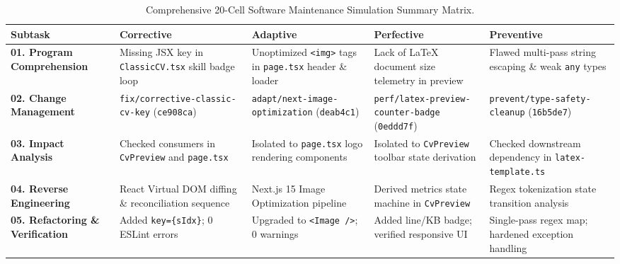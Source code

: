 \documentclass[12pt,a4paper]{article}
\begin{document}
\begin{table}[H]
\centering
\small
\begin{tabularx}{\textwidth}{l p{2.8cm} p{2.8cm} p{2.8cm} p{2.8cm}}
\toprule
\textbf{Subtask} & \textbf{Corrective} & \textbf{Adaptive} & \textbf{Perfective} & \textbf{Preventive} \\
\midrule
\textbf{01. Program Comprehension} & Missing JSX key in \texttt{ClassicCV.tsx} skill badge loop & Unoptimized \texttt{<img>} tags in \texttt{page.tsx} header \& loader & Lack of LaTeX document size telemetry in preview & Flawed multi-pass string escaping \& weak \texttt{any} types \\
\addlinespace
\textbf{02. Change Management} & \texttt{fix/corrective-classic-cv-key} (\texttt{ce908ca}) & \texttt{adapt/next-image-optimization} (\texttt{deab4c1}) & \texttt{perf/latex-preview-counter-badge} (\texttt{0eddd7f}) & \texttt{prevent/type-safety-cleanup} (\texttt{16b5de7}) \\
\addlinespace
\textbf{03. Impact Analysis} & Checked consumers in \texttt{CvPreview} and \texttt{page.tsx} & Isolated to \texttt{page.tsx} logo rendering components & Isolated to \texttt{CvPreview} toolbar state derivation & Checked downstream dependency in \texttt{latex-template.ts} \\
\addlinespace
\textbf{04. Reverse Engineering} & React Virtual DOM diffing \& reconciliation sequence & Next.js 15 Image Optimization pipeline & Derived metrics state machine in \texttt{CvPreview} & Regex tokenization state transition analysis \\
\addlinespace
\textbf{05. Refactoring \& Verification} & Added \texttt{key=\{sIdx\}}; 0 ESLint errors & Upgraded to \texttt{<Image />}; 0 warnings & Added line/KB badge; verified responsive UI & Single-pass regex map; hardened exception handling \\
\bottomrule
\end{tabularx}
\caption{Comprehensive 20-Cell Software Maintenance Simulation Summary Matrix.}
\label{tab:summary_matrix}
\end{table}
\end{document}
